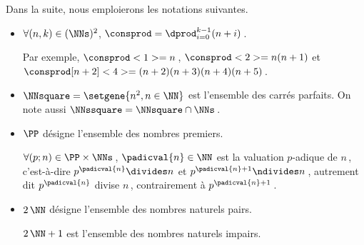 Dans la suite, nous emploierons les notations suivantes.
%
\begin{itemize}
	\item $\forall (n, k) \in ( \NNs )^2$, $\consprod = \dprod_{i = 0}^{k-1} (n + i)$\,. 
	
	\noindent
	Par exemple,
	$\consprod<1> = n$\,,
	$\consprod<2> = n (n+1)$
	et
	$\consprod[n+2]<4> = (n+2) (n+3) (n+4) (n+5)$\,.


	\medskip
	\item $\NNsquare = \setgene{n^2, n \in \NN}$ est l'ensemble des carrés parfaits.
	On note aussi $\NNssquare = \NNsquare \cap \NNs$\,.



	\medskip
	\item $\PP$ désigne l'ensemble des nombres premiers.
	
	\noindent
	$\forall (p ; n) \in \PP \times \NNs$\,, $\padicval{n} \in \NN$ est la valuation $p$-adique de $n$\,,
	c'est-à-dire 
	$p^{\padicval{n}} \divides n$ et $p^{\padicval{n} + 1} \ndivides n$\,,
	autrement dit
	$p^{\padicval{n}}$ divise $n$\,, contrairement à $p^{\padicval{n} + 1}$\,.



	
	\medskip
	\item $2\,\NN$ désigne l'ensemble des nombres naturels pairs.
	
	\noindent
	$2\,\NN + 1$ est l'ensemble des nombres naturels impairs.


\end{itemize}